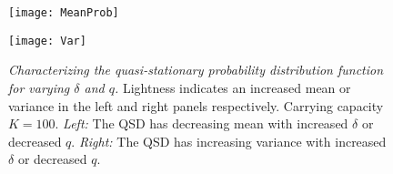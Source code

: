 
\iffalse
\begin{figure}[h]
	\centering
	\subfloat[\emph{Probability distribution with $\delta=1.00$ and $K=100$}]{\texttt{[image: Figure1-A]}\label{qsd:q}}
	\hfill
	\subfloat[\emph{Probability distribution with $q=0.06$ and $K=100$}]{\texttt{[image: Figure1-B]}\label{qsd:delta}}
	\caption{\emph{Probability distribution of the population} The conditional probability distribution functions as found using the quasi-stationary distribution algorithm. Note that for each curve, the population cutoff $N$ is outside the domain presented here. In \ref{qsd:q} increasing lightness indicates an increase in $q$. Similarly, the lightness increase in \ref{qsd:delta} corresponds to an increase in $\delta$}
	\label{qsd}
\end{figure}
\fi
\begin{figure}[h]
	\centering
	\begin{minipage}{0.49\linewidth}
		\centering
		\texttt{[image: MeanProb]}
	\end{minipage}
	\begin{minipage}{0.49\linewidth}
		\centering
		\texttt{[image: Var]}
	\end{minipage}
	\caption{\emph{Characterizing the quasi-stationary probability distribution function for varying $\delta$ and $q$.} Lightness indicates an increased mean or variance in the left and right panels respectively. Carrying capacity $K=100$. 
	\emph{Left:} The QSD has decreasing mean with increased $\delta$ or decreased $q$. 
	\emph{Right:} The QSD has increasing variance with increased $\delta$ or decreased $q$. 
	}
	\label{qsd}
\end{figure}

